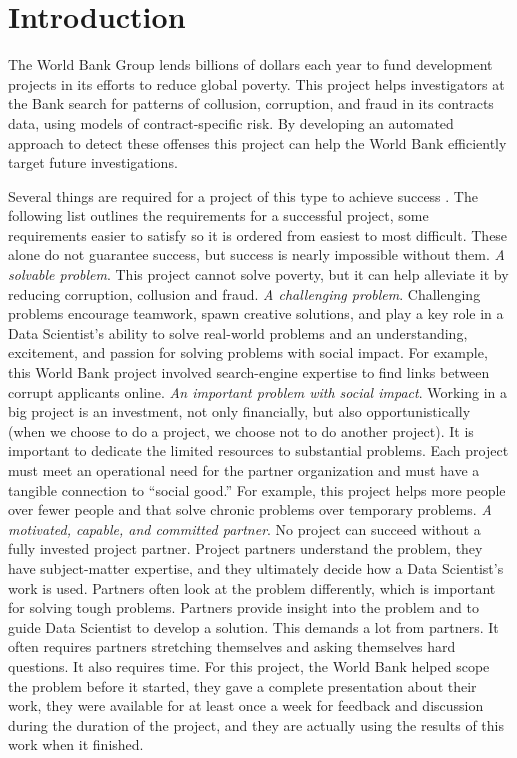 \chapter{Introduction}\label{chap_intro}

The World Bank Group lends billions of dollars each year to fund development projects in its efforts to reduce global poverty. This project helps investigators at the Bank search for patterns of collusion, corruption, and fraud in its contracts data, using models of contract-specific risk. By developing an automated approach to detect these offenses this project can help the World Bank efficiently target future investigations.

Several things are required for a project of this type to achieve success \parencite{dssg_proj_list}. The following list outlines the requirements for a successful project, some requirements easier to satisfy so it is ordered from easiest to most difficult. These alone do not guarantee success, but success is nearly impossible without them.  \textit{A solvable problem}. This project cannot solve poverty, but it can help alleviate it by reducing corruption, collusion and fraud. 
\textit{A challenging problem}. Challenging problems encourage teamwork, spawn creative solutions, and play a key role in a Data Scientist's ability to solve real-world problems and an understanding, excitement, and passion for solving problems with social impact. For example, this World Bank project involved  search-engine expertise to find links between corrupt applicants online. 
\textit{An important problem with social impact}. Working in a big project is an investment, not only financially, but also opportunistically (when we choose to do a project, we choose not to do another project). It is important to dedicate the limited resources to substantial problems. Each project must meet an operational need for the partner organization and must have a tangible connection to ``social good.'' For example, this project helps more people over fewer people and that solve chronic problems over temporary problems. 
\textit{A motivated, capable, and committed partner}. No project can succeed without a fully invested project partner. Project partners understand the problem, they have subject-matter expertise, and they ultimately decide how a Data Scientist's work is used. Partners often look at the problem differently, which is important for solving tough problems.  Partners provide insight into the problem and to guide Data Scientist to develop a solution. This demands a lot from partners. It often requires partners stretching themselves and asking themselves hard questions. It also requires time. For this project, the World Bank helped scope the problem before it started, they gave a complete presentation about their work, they were available for at least once a week for feedback and discussion during the duration of the project, and they are actually using the results of this work when it finished. 
